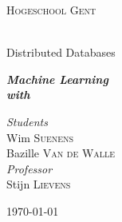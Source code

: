 \documentclass[12pt]{DistributedDatabases}[2021/12/09]
\begin{document}
\frontmatter %

\begin{titlepage}
\begin{center}

\vspace*{.06\textheight}
{\scshape\LARGE{Hogeschool Gent}}
\vspace{1.5cm}

\HRule \\[0.8cm] %
{\huge{Distributed Databases}}\vspace{0.4cm}
\HRule \\[1.5cm] %

\vfill

\large \textit{\textbf{Machine Learning}}\\[0.4cm]
\textit{\textbf{with}}\\[0.4cm]
  
\vfill

\begin{flushright} \large
  \emph{Students}\\
  Wim \textsc{Suenens} \\
  Bazille \textsc{Van de Walle} \\
  \vspace{1.0cm}
  \emph{Professor}\\
  Stijn \textsc{Lievens}
\end{flushright}

\vfill

{\large \today}\\[2cm]
  
\vfill
\end{center}
\end{titlepage}

\tableofcontents

\mainmatter %
\setcounter{page}{1}




\end{document}
